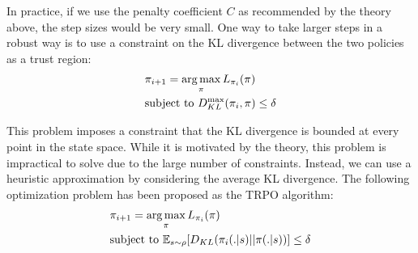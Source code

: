 In practice, if we use the penalty coefficient $C$ as recommended by the theory above, the step sizes would be very small. One way to take larger steps in a robust way is to use a constraint on the KL divergence between the two policies as a trust region:
\begin{align*}
    &\pi_{i + 1} = \operatorname*{arg\,max}_{\pi} L_{\pi_i}(\pi)\\
    &\text{subject to } D_{KL}^{\max}(\pi_i, \pi) \le \delta
\end{align*}

This problem imposes a constraint that the KL divergence is bounded at every point in the state space. While it is motivated by the theory, this problem is impractical to solve due to the large number of constraints. Instead, we can use a heuristic approximation by considering the average KL divergence. The following optimization problem has been proposed as the TRPO algorithm:
\begin{align*}
    &\pi_{i + 1} = \operatorname*{arg\,max}_{\pi} L_{\pi_i}(\pi)\\
    &\text{subject to } \mathbb{E}_{s \sim \rho}[D_{KL}(\pi_i (.|s) || \pi(.|s))] \le \delta
\end{align*}